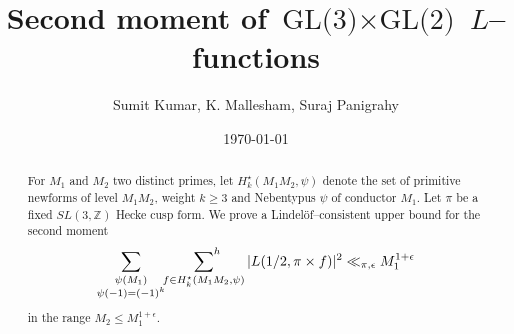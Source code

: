 \documentclass[12pt,a4paper,twoside, reqno]{amsart}
\begin{document}
	
	\author{ Sumit Kumar,  K. Mallesham, Suraj Panigrahy}
	
	\title{ Second moment of $\textrm{GL(3)} \times \textrm{GL(2)}$ $L$--functions}
	\address{ Suraj Panigrahy  }	
	
	\address{Sumit Kumar }
	
	\address{ K. Mallesham   }
	
	\date{\today}
	
	




	

\maketitle
    
	\begin{abstract}
    For $M_1$ and  $ M_2$  two distinct primes, let   $ H_k^\star(M_1M_2, \psi)$ denote the set of primitive newforms of level $M_1M_2$, weight $k\geq 3$ and  Nebentypus $\psi$ of conductor $M_1$.  Let  $\pi$ be a fixed $SL(3, \mathbb{Z})$ Hecke cusp form. We prove a Lindelöf--consistent upper bound for the second moment  
        \[ \mathop{ \sum_{\substack{\psi(M_1) \\ \psi(-1)=(-1)^k }}} \sideset{}{^h}\sum_{f \in H_k^{\star}(M_1M_2,\psi)} |L(1/2, \pi \times f)|^2 \ll_{\pi,\epsilon} M_1^{1+\epsilon}\] 
        in the range $M_2\leq M_1^{1+\epsilon}$.
	\end{abstract}
	
	
	
\end{document}
